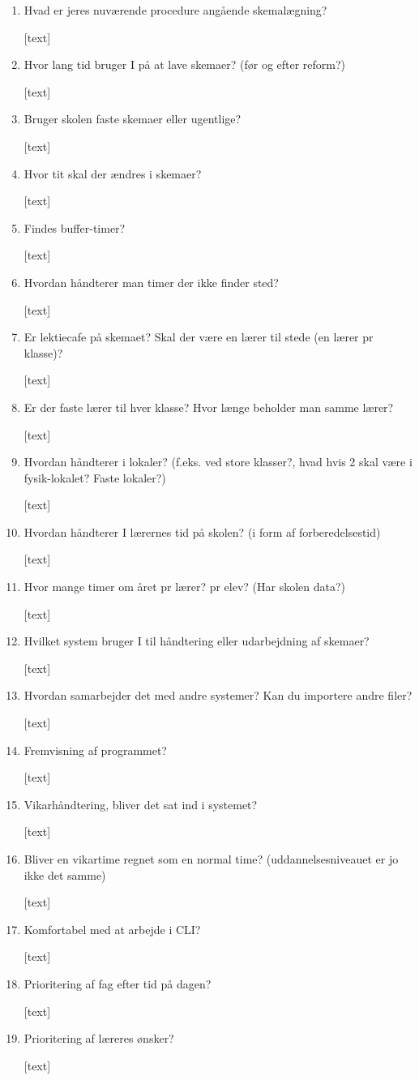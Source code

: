 \begin{enumerate}
	\item Hvad er jeres nuværende procedure angående skemalægning?
	
	[text]
	\item Hvor lang tid bruger I på at lave skemaer? (før og efter reform?)
	
	[text]
	\item Bruger skolen faste skemaer eller ugentlige?
	
	[text]
	\item Hvor tit skal der ændres i skemaer?
	
	[text]
	\item Findes buffer-timer? 
	
	[text]
	\item Hvordan håndterer man timer der ikke finder sted?
	
	[text]
	\item Er lektiecafe på skemaet? Skal der være en lærer til stede (en lærer pr klasse)?
	
	[text]
	\item Er der faste lærer til hver klasse? Hvor længe beholder man samme lærer?
	
	[text]
	\item Hvordan håndterer i lokaler? (f.eks. ved store klasser?, hvad hvis 2 skal være i fysik-lokalet? Faste lokaler?)
	
	[text]
	\item Hvordan håndterer I lærernes tid på skolen? (i form af forberedelsestid)
	
	[text]
	\item Hvor mange timer om året pr lærer? pr elev? (Har skolen data?)
	
	[text]
	\item Hvilket system bruger I til håndtering eller udarbejdning af skemaer?
	
	[text]
	\item Hvordan samarbejder det med andre systemer? Kan du importere andre filer?
	
	[text]
	\item Fremvisning af programmet?
	
	[text]
	\item Vikarhåndtering, bliver det sat ind i systemet?
	
	[text]
	\item Bliver en vikartime regnet som en normal time? (uddannelsesniveauet er jo ikke det samme)
	
	[text]
	\item Komfortabel med at arbejde i CLI?
	
	[text]
	\item Prioritering af fag efter tid på dagen?
	
	[text]
	\item Prioritering af læreres ønsker?
	
	[text]
\end{enumerate}